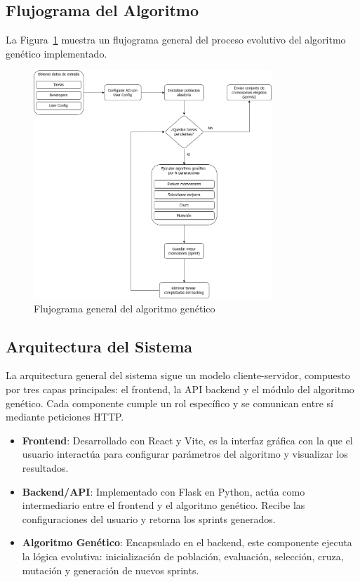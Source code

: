 \newpage

\subsection{Flujograma del Algoritmo}

La Figura~\ref{fig:flujo} muestra un flujograma general del proceso evolutivo del algoritmo genético implementado.

\begin{figure}[htbp]
    \centering
    \includegraphics[width=0.8\textwidth]{imagenes/metodo-flow.png}
    \caption{Flujograma general del algoritmo genético}
    \label{fig:flujo}
\end{figure}

\subsection{Arquitectura del Sistema}

La arquitectura general del sistema sigue un modelo cliente-servidor, compuesto por tres capas principales: el frontend, la API backend y el módulo del algoritmo genético. Cada componente cumple un rol específico y se comunican entre sí mediante peticiones HTTP.

\begin{itemize}
    \item \textbf{Frontend}: Desarrollado con React y Vite, es la interfaz gráfica con la que el usuario interactúa para configurar parámetros del algoritmo y visualizar los resultados.
    \item \textbf{Backend/API}: Implementado con Flask en Python, actúa como intermediario entre el frontend y el algoritmo genético. Recibe las configuraciones del usuario y retorna los sprints generados.
    \item \textbf{Algoritmo Genético}: Encapsulado en el backend, este componente ejecuta la lógica evolutiva: inicialización de población, evaluación, selección, cruza, mutación y generación de nuevos sprints.
\end{itemize}

